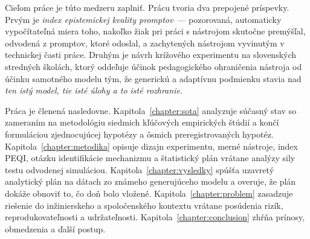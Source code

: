 Cieľom práce je túto medzeru zaplniť. Prácu tvoria dva prepojené príspevky. Prvým je \emph{index epistemickej kvality promptov}~--- pozorovaná, automaticky vypočítateľná miera toho, nakoľko žiak pri práci s nástrojom skutočne premýšľal, odvodená z promptov, ktoré odoslal, a zachytených nástrojom vyvinutým v technickej časti práce. Druhým je návrh krížového experimentu na slovenských stredných školách, ktorý oddeľuje účinok pedagogického ohraničenia nástroja od účinku samotného modelu tým, že generickú a adaptívnu podmienku stavia nad \emph{ten istý model, tie isté úlohy a to isté rozhranie}.

Práca je členená nasledovne. Kapitola~\ref{chapter:sota} analyzuje súčasný stav so zameraním na metodológiu siedmich kľúčových empirických štúdií a končí formuláciou zjednocujúcej hypotézy a ôsmich preregistrovaných hypotéz. Kapitola~\ref{chapter:metodika} opisuje dizajn experimentu, merné nástroje, index PEQI, otázku identifikácie mechanizmu a štatistický plán vrátane analýzy sily testu odvodenej simuláciou. Kapitola~\ref{chapter:vysledky} spúšťa uzavretý analytický plán na dátach zo známeho generujúceho modelu a overuje, že plán dokáže obnoviť to, čo doň bolo vložené. Kapitola~\ref{chapter:problem} zasadzuje riešenie do inžinierskeho a spoločenského kontextu vrátane posúdenia rizík, reprodukovateľnosti a udržateľnosti. Kapitola~\ref{chapter:conclusion} zhŕňa prínosy, obmedzenia a ďalší postup.
